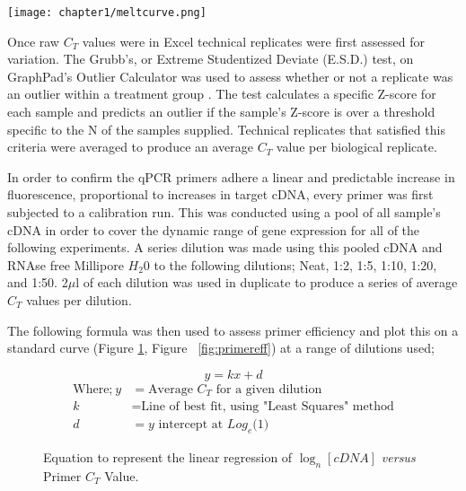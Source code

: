 \begin{figure*}[!hbtp]
\centering
\texttt{[image: chapter1/meltcurve.png]}
\caption[Representative plot of a post-PCR melt curve]{Representative plot of a post-PCR melt curve as generated by StepOne RealTime PCR Software (Applied Biosystems, Life Technologies™ - USA). Plot shows the levels of fluorescence against changing temperature to ensure primers show a uniform melting point that would not yield false positive detections.}
\label{fig:meltcurve}
\end{figure*}

Once raw $C_{T}$ values were in Excel technical replicates were first assessed for variation. The Grubb’s, or Extreme Studentized Deviate (E.S.D.) test, on GraphPad’s Outlier Calculator was used to assess whether or not a replicate was an outlier within a treatment group \cite{doi:10.1080/00401706.1969.10490657}. The test calculates a specific Z-score for each sample and predicts an outlier if the sample's Z-score is over a threshold specific to the N of the samples supplied. Technical replicates that satisfied this criteria were averaged to produce an average $C_{T}$ value per biological replicate.

In order to confirm the qPCR primers adhere a linear and predictable increase in fluorescence, proportional to increases in target cDNA, every primer was first subjected to a calibration run. This was conducted using a pool of all sample’s cDNA in order to cover the dynamic range of gene expression for all of the following experiments. A series dilution was made using this pooled cDNA and RNAse free Millipore $H_{2}0$ to the following dilutions; Neat, 1:2, 1:5, 1:10, 1:20, and 1:50. 2$\mu$l of each dilution was used in duplicate to produce a series of average $C_{T}$ values per dilution.

The following formula was then used to assess primer efficiency and plot this on a standard curve (Figure \ref{eq:linearreg}, Figure ~\ref{fig:primereff}) at a range of dilutions used;

\begin{figure}[!hbtp]
\LARGE
\[y=kx+d\]
\normalsize
\begin{align*}
\text{Where;} ~y &= \text{Average $C_{T}$ for a given dilution} \\
k &= \text{Line of best fit, using "Least Squares" method} \\
d &= y \text{ intercept at $Log_{e}$(1)}
\end{align*}
\caption[Equation of linear regression for Primer validation]{Equation to represent the linear regression of $\log_{n}[cDNA]$ \textit{versus} Primer $C_{T}$ Value.}
\label{eq:linearreg}
\end{figure}

